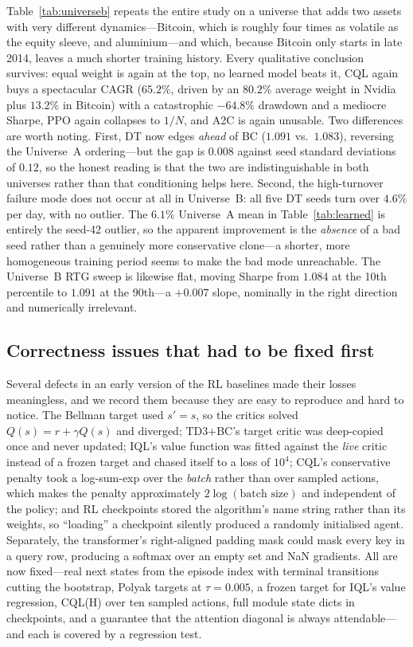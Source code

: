 \documentclass[11pt]{article}
\begin{document}
Table~\ref{tab:universeb} repeats the entire study on a universe that adds two assets with very
different dynamics---Bitcoin, which is roughly four times as volatile as the equity sleeve, and
aluminium---and which, because Bitcoin only starts in late 2014, leaves a much shorter training
history. Every qualitative conclusion survives: equal weight is again at the top, no learned
model beats it, CQL again buys a spectacular CAGR ($65.2\%$, driven by an $80.2\%$ average weight in Nvidia plus $13.2\%$
in Bitcoin)
with a catastrophic $-64.8\%$ drawdown and a mediocre Sharpe, PPO again collapses to $1/N$, and
A2C is again unusable. Two differences are worth noting. First, DT now edges \emph{ahead} of BC
($1.091$ vs.\ $1.083$), reversing the Universe~A ordering---but the gap is $0.008$ against seed
standard deviations of $0.12$, so the honest reading is that the two are indistinguishable in
both universes rather than that conditioning helps here. Second, the high-turnover failure mode does not
occur at all in Universe~B: all five DT seeds turn over $4.6\%$ per day, with no outlier. The
$6.1\%$ Universe~A mean in Table~\ref{tab:learned} is entirely the seed-42 outlier, so the
apparent improvement is the \emph{absence} of a bad seed rather than a genuinely more
conservative clone---a shorter, more homogeneous training period seems to make the bad mode
unreachable. The Universe~B
RTG sweep is likewise flat, moving Sharpe from $1.084$ at the 10th percentile to $1.091$ at the
90th---a $+0.007$ slope, nominally in the right direction and numerically irrelevant.

\subsection{Correctness issues that had to be fixed first}
\label{sec:bugs}

Several defects in an early version of the RL baselines made their losses meaningless, and we
record them because they are easy to reproduce and hard to notice. The Bellman target used
$s' = s$, so the critics solved $Q(s) = r + \gamma Q(s)$ and diverged; TD3+BC's target critic
was deep-copied once and never updated; IQL's value function was fitted against the \emph{live}
critic instead of a frozen target and chased itself to a loss of $10^4$; CQL's conservative
penalty took a log-sum-exp over the \emph{batch} rather than over sampled actions, which makes
the penalty approximately $2\log(\text{batch size})$ and independent of the policy; and RL
checkpoints stored the algorithm's name string rather than its weights, so ``loading'' a
checkpoint silently produced a randomly initialised agent. Separately, the transformer's
right-aligned padding mask could mask every key in a query row, producing a softmax over an
empty set and NaN gradients. All are now fixed---real next states from the episode index with
terminal transitions cutting the bootstrap, Polyak targets at $\tau = 0.005$, a frozen target
for IQL's value regression, CQL(H) over ten sampled actions, full module state dicts in
checkpoints, and a guarantee that the attention diagonal is always attendable---and each is
covered by a regression test.
\end{document}

